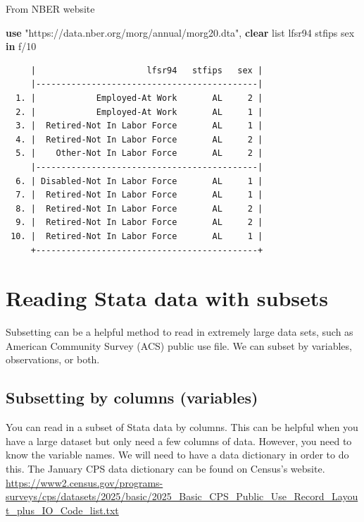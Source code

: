 \documentclass[
]{book}
\newenvironment{Shaded}{\begin{snugshade}}{\end{snugshade}}
\newcommand{\KeywordTok}[1]{\textcolor[rgb]{0.13,0.29,0.53}{\textbf{#1}}}
\newcommand{\NormalTok}[1]{#1}
\newcommand{\OtherTok}[1]{\textcolor[rgb]{0.56,0.35,0.01}{#1}}
\newcommand{\StringTok}[1]{\textcolor[rgb]{0.31,0.60,0.02}{#1}}
\begin{document}
From NBER website

\begin{Shaded}
\begin{Highlighting}[]
\KeywordTok{use} \StringTok{"https://data.nber.org/morg/annual/morg20.dta"}\NormalTok{, }\KeywordTok{clear}
\OtherTok{list}\NormalTok{ lfsr94 stfips sex }\KeywordTok{in}\NormalTok{ f/10}
\end{Highlighting}
\end{Shaded}

\begin{verbatim}
     |                      lfsr94   stfips   sex |
     |--------------------------------------------|
  1. |            Employed-At Work       AL     2 |
  2. |            Employed-At Work       AL     1 |
  3. |  Retired-Not In Labor Force       AL     1 |
  4. |  Retired-Not In Labor Force       AL     2 |
  5. |    Other-Not In Labor Force       AL     2 |
     |--------------------------------------------|
  6. | Disabled-Not In Labor Force       AL     1 |
  7. |  Retired-Not In Labor Force       AL     1 |
  8. |  Retired-Not In Labor Force       AL     2 |
  9. |  Retired-Not In Labor Force       AL     2 |
 10. |  Retired-Not In Labor Force       AL     1 |
     +--------------------------------------------+
\end{verbatim}

\section{Reading Stata data with subsets}\label{reading-stata-data-with-subsets}

Subsetting can be a helpful method to read in extremely large data sets, such as American Community Survey (ACS) public use file. We can subset by variables, observations, or both.

\subsection{Subsetting by columns (variables)}\label{subsetting-by-columns-variables}

You can read in a subset of Stata data by columns. This can be helpful when you have a large dataset but only need a few columns of data. However, you need to know the variable names. We will need to have a data dictionary in order to do this. The January CPS data dictionary can be found on Census's website. \url{https://www2.census.gov/programs-surveys/cps/datasets/2025/basic/2025_Basic_CPS_Public_Use_Record_Layout_plus_IO_Code_list.txt}
\end{document}
